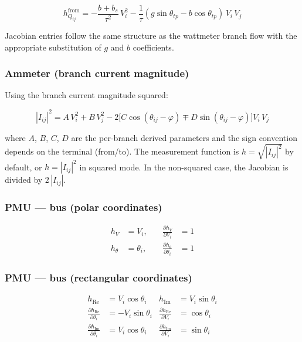 \documentclass[11pt,a4paper]{article}
\begin{document}
\begin{equation}
  h_{Q_{ij}}^\text{from} =
    -\frac{b + b_s}{\tau^2}\,V_i^2
    - \frac{1}{\tau}(g\sin\theta_{tp} - b\cos\theta_{tp})\,V_i\,V_j
\end{equation}

Jacobian entries follow the same structure as the wattmeter branch flow
with the appropriate substitution of $g$ and $b$ coefficients.

\subsubsection{Ammeter (branch current magnitude)}

Using the branch current magnitude squared:

\begin{equation}
  |I_{ij}|^2 = A\,V_i^2 + B\,V_j^2
    - 2\bigl[C\cos(\theta_{ij}{-}\varphi) \mp D\sin(\theta_{ij}{-}\varphi)\bigr]
    V_i\,V_j
\end{equation}

\noindent
where $A$, $B$, $C$, $D$ are the per-branch derived parameters and the
sign convention depends on the terminal (from/to).  The measurement
function is $h = \sqrt{|I_{ij}|^2}$ by default, or $h = |I_{ij}|^2$ in
squared mode.  In the non-squared case, the Jacobian is divided by
$2\,|I_{ij}|$.

\subsubsection{PMU --- bus (polar coordinates)}

\begin{align}
  h_V &= V_i, &\quad \frac{\partial h_V}{\partial V_i} &= 1 \\
  h_\theta &= \theta_i, &\quad \frac{\partial h_\theta}{\partial \theta_i} &= 1
\end{align}

\subsubsection{PMU --- bus (rectangular coordinates)}

\begin{align}
  h_\text{Re} &= V_i\cos\theta_i
  & h_\text{Im} &= V_i\sin\theta_i \\
  \frac{\partial h_\text{Re}}{\partial \theta_i} &= -V_i\sin\theta_i
  & \frac{\partial h_\text{Re}}{\partial V_i} &= \cos\theta_i \\
  \frac{\partial h_\text{Im}}{\partial \theta_i} &= V_i\cos\theta_i
  & \frac{\partial h_\text{Im}}{\partial V_i} &= \sin\theta_i
\end{align}
\end{document}
